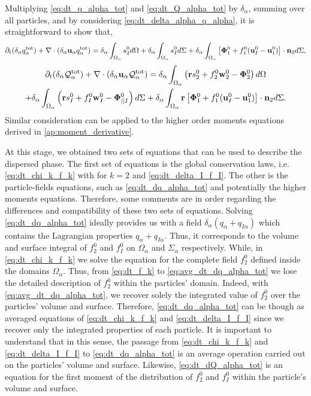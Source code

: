Multiplying \ref{eq:dt_q_alpha_tot} and \ref{eq:dt_Q_alpha_tot} by $\delta_\alpha$, summing over all particles, and by considering \ref{eq:dt_delta_alpha_q_alpha}, it is straightforward to show that,
\begin{equation}
    \partial_t (\delta_\alpha  q_\alpha^\text{tot})
    + \mathbf{\nabla}\cdot (\delta_\alpha\textbf{u}_\alpha q_\alpha^\text{tot})
    = \delta_\alpha\int_{\Omega_\alpha}  s_2^0  d\Omega
    + \delta_\alpha\int_{\Omega_\alpha}  s_I^0  d\Sigma
    + \delta_\alpha\int_{\Omega_\alpha}  \left[\mathbf{\Phi}_1^0 + f_1^0 (\textbf{u}_I^0-\textbf{u}_1^0) \right] \cdot \textbf{n}_2  d\Sigma,
    \label{eq:dt_dq_alpha_tot}
\end{equation}
\begin{multline}
    \partial_t (\delta_\alpha  \mathcal{Q}_\alpha^\text{tot})
    + \mathbf{\nabla}\cdot (\delta_\alpha\textbf{u}_\alpha \mathcal{Q}_\alpha^\text{tot})
    = \delta_\alpha\int_{\Omega_\alpha}  \left(
        \textbf{r} s_2^0         
        + f_2^0  \textbf{w}_2^0 
        - \mathbf{\Phi}_2^0
    \right)  d\Omega\\
    + \delta_\alpha\int_{\Omega_\alpha}  \left(
        \textbf{r}s_I^0
        + f_I^0 \textbf{w}_I^0
        - \mathbf{\Phi}_{||I}^0
    \right)  d\Sigma
    + \delta_\alpha\int_{\Omega_\alpha}  \textbf{r} \left[
        \mathbf{\Phi}_1^0
        + f_1^0 (\textbf{u}_I^0-\textbf{u}_1^0)
    \right]\cdot \textbf{n}_2   d\Sigma.
    \label{eq:dt_dQ_alpha_tot}
\end{multline}
Similar consideration can be applied to the higher order moments equations derived in \ref{ap:moment_derivative}.

At this stage, we obtained two sets of equations that can be used to describe the dispersed phase. 
The first set of equations is the global conservation laws, i.e. \ref{eq:dt_chi_k_f_k} with for $k=2$ and \ref{eq:dt_delta_I_f_I}. 
The other is the particle-fields equations, such as \ref{eq:dt_dq_alpha_tot} and potentially the higher moments equations.
Therefore, some comments are in order regarding the differences and compatibility of these two sets of equations.
Solving \ref{eq:dt_dq_alpha_tot} ideally provides us with a field $\delta_\alpha(q_\alpha+q_{I\alpha})$ which contains the Lagrangian properties $q_\alpha+q_{I\alpha}$.
Thus, it corresponds to the volume and surface integral of $f_2^0$ and $f_I^0$ on $\Omega_\alpha$ and $\Sigma_\alpha$ respectively.
While, in \ref{eq:dt_chi_k_f_k} we solve the equation for the complete field $f_2^0$ defined inside the domains $\Omega_\alpha$.  
Thus, from  \ref{eq:dt_f_k} to \ref{eq:avg_dt_dq_alpha_tot} we lose the detailed description of $f_2^0$ within the particles' domain.
Indeed, with \ref{eq:avg_dt_dq_alpha_tot}, we recover solely the integrated value of $f_2^0$ over the particles' volume and surface. 
Therefore, \ref{eq:dt_dq_alpha_tot} can be though as averaged equations of \ref{eq:dt_chi_k_f_k} and \ref{eq:dt_delta_I_f_I} since we recover only the integrated properties of each particle. 
It is important to understand that in this sense, the passage from \ref{eq:dt_chi_k_f_k} and \ref{eq:dt_delta_I_f_I} to \ref{eq:dt_dq_alpha_tot} is an average operation carried out on the particles' volume and surface.
Likewise, \ref{eq:dt_dQ_alpha_tot} is an equation for the first moment of the distribution of $f_2^0$ and $f_I^0$ within the particle's volume and surface.

